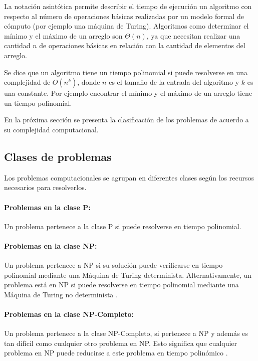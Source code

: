 La notación asintótica permite describir el tiempo de ejecución un algoritmo con respecto al número de operaciones 
básicas realizadas por un modelo formal de cómputo (por ejemplo una máquina de Turing). Algoritmos como determinar el mínimo y el máximo de
un arreglo son $\Theta(n)$, ya que necesitan realizar una cantidad $n$ de operaciones básicas en relación con
la cantidad de elementos del arreglo.

Se dice que un algoritmo tiene un tiempo polinomial si puede resolverse en una complejidad de $O(n^k)$, donde $n$ es el tamaño de la entrada del algoritmo y $k$
es una constante. Por ejemplo encontrar el mínimo y el máximo de un arreglo tiene un tiempo polinomial.


En la próxima sección se presenta la clasificación de los problemas de acuerdo a su complejidad computacional.
\subsection{Clases de problemas}

Los problemas computacionales \cite{authomataTheory} se agrupan en diferentes clases según los recursos necesarios para resolverlos.

\paragraph{Problemas en la clase P:}
Un problema pertenece a la clase P si puede resolverse en tiempo polinomial.

\paragraph{Problemas en la clase NP:}
Un problema pertenece a NP si su solución puede verificarse en tiempo polinomial mediante una Máquina de Turing 
determinista. Alternativamente, un problema está en NP si puede resolverse en tiempo polinomial mediante una 
Máquina de Turing no determinista \cite{authomataTheory}.

\paragraph{Problemas en la clase NP-Completo:}
Un problema pertenece a la clase NP-Completo, si pertenece a NP y además es tan difícil como cualquier 
otro problema en NP. Esto significa que cualquier problema en NP puede reducirse a este problema en 
tiempo polinómico \cite{authomataTheory}.

